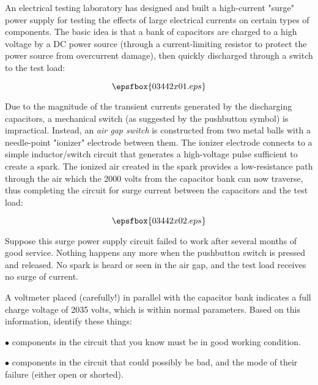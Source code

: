 

An electrical testing laboratory has designed and built a high-current "surge" power supply for testing the effects of large electrical currents on certain types of components.  The basic idea is that a bank of capacitors are charged to a high voltage by a DC power source (through a current-limiting resistor to protect the power source from overcurrent damage), then quickly discharged through a switch to the test load:

$$\epsfbox{03442x01.eps}$$

Due to the magnitude of the transient currents generated by the discharging capacitors, a mechanical switch (as suggested by the pushbutton symbol) is impractical.  Instead, an {\it air gap switch} is constructed from two metal balls with a needle-point "ionizer" electrode between them.  The ionizer electrode connects to a simple inductor/switch circuit that generates a high-voltage pulse sufficient to create a spark.  The ionized air created in the spark provides a low-resistance path through the air which the 2000 volts from the capacitor bank can now traverse, thus completing the circuit for surge current between the capacitors and the test load:

$$\epsfbox{03442x02.eps}$$

Suppose this surge power supply circuit failed to work after several months of good service.  Nothing happens any more when the pushbutton switch is pressed and released.  No spark is heard or seen in the air gap, and the test load receives no surge of current.

\goodbreak
A voltmeter placed (carefully!) in parallel with the capacitor bank indicates a full charge voltage of 2035 volts, which is within normal parameters.  Based on this information, identify these things:

\vskip 10pt

\medskip
\item{$\bullet$}  components in the circuit that you know must be in good working condition.
\vskip 20pt
\item{$\bullet$}  components in the circuit that could possibly be bad, and the mode of their failure (either open or shorted).
\medskip






